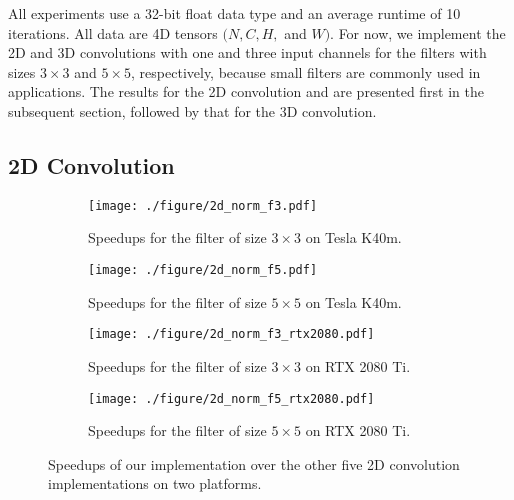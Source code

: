 All experiments use a 32-bit float data type and an average runtime of 10 iterations. All data are 4D tensors $(N,C,H,$ and $W)$. For
now, we implement the 2D and 3D convolutions with one and three input channels for the filters with sizes $3 \times 3$ and $5 \times 5$, respectively, because small filters are commonly used in applications. The results for the 2D convolution and are presented first in the subsequent section, followed by that for the 3D convolution.

\subsection{2D Convolution}
\begin{figure*}
\begin{subfigure}{\columnwidth}
		\centering
		 \texttt{[image: ./figure/2d\_norm\_f3.pdf]}
		 \caption{Speedups for the filter of size $3 \times 3$ on Tesla K40m.}
		 \label{fig:2druntimef3c1}
	\end{subfigure}
	\begin{subfigure}{\columnwidth}
		\centering
		 \texttt{[image: ./figure/2d\_norm\_f5.pdf]}
		 \caption{Speedups for the filter of size $5 \times 5$ on Tesla K40m.}
		 \label{fig:2druntimef5c1}
	\end{subfigure}
	
	\begin{subfigure}{\columnwidth}
		\centering
		 \texttt{[image: ./figure/2d\_norm\_f3\_rtx2080.pdf]}
		 \caption{Speedups for the filter of size $3 \times 3$ on RTX 2080 Ti.}
		 \label{fig:2druntimef3c12080}
	\end{subfigure}
	\begin{subfigure}{\columnwidth}
		\centering
		 \texttt{[image: ./figure/2d\_norm\_f5\_rtx2080.pdf]}
		 \caption{Speedups for the filter of size $5 \times 5$ on RTX 2080 Ti.}
		 \label{fig:2druntimef5c12080}
	\end{subfigure}
	
	\caption{Speedups of our implementation over the other five 2D convolution implementations on two platforms.}
   \label{fig:2druntime}
\end{figure*}

